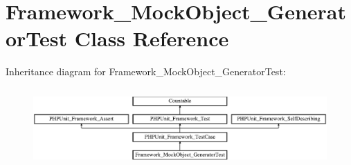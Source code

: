 \hypertarget{class_framework___mock_object___generator_test}{}\section{Framework\+\_\+\+Mock\+Object\+\_\+\+Generator\+Test Class Reference}
\label{class_framework___mock_object___generator_test}
Inheritance diagram for Framework\+\_\+\+Mock\+Object\+\_\+\+Generator\+Test\+:\begin{figure}[H]
\begin{center}
\leavevmode
\includegraphics[height=3.047619cm]{class_framework___mock_object___generator_test}
\end{center}
\end{figure}

